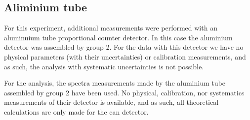 \subsection{Aliminium tube}
For this experiment, additional measurements were performed with an aluminuium tube proportional counter detector. In this case the aluminium detector was assembled by group 2. For the data with this detector we have no physical parameters (with their uncertainties) or calibration measurements, and as such, the analysis with systematic uncertainties is not possible.




For the analysis, the spectra measurements made by the aluminium tube assembled by group 2 have been used. No physical, calibration, nor systematics measurements of their detector is available, and as such, all theoretical calculations are only made for the can detector.